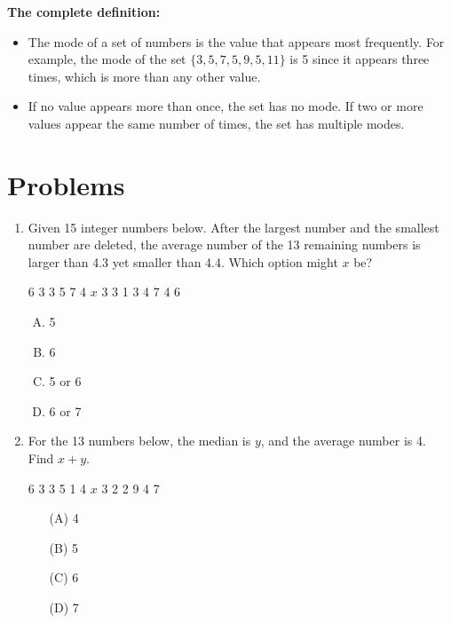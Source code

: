 \documentclass[11pt]{scrartcl}
\begin{document}
    \textbf{The complete definition:}
\begin{itemize}
    \item The mode of a set of numbers is the value that appears most frequently. For example, the mode of the set $\{3, 5, 7, 5, 9, 5, 11\}$ is 5 since it appears three times, which is more than any other value.

    \item If no value appears more than once, the set has no mode. If two or more values appear the same number of times, the set has multiple modes.
\end{itemize}
    
\section{Problems}
\begin{enumerate}
        \item Given 15 integer numbers below. After the largest number and the smallest number are deleted, the average number of the 13 remaining numbers is larger than 4.3 yet smaller than 4.4. Which option might $x$ be?
    \begin{tcolorbox}[colback=green!10!white,colframe=green!75!black,box align=center,
    halign=center,
    valign=center]
    6  3  3  5  7  4  $x$  3  3  1  3  4  7  4  6
    \end{tcolorbox}

    \begin{enumerate}[(A)]
        \item 5
        \item 6
        \item 5 or 6
        \item 6 or 7
    \end{enumerate}
    \vspace{3\baselineskip}

    \item For the 13 numbers below, the median is $y$, and the average number is 4. Find $x+y$.
    
   \begin{tcolorbox}[colback=red!10!white,colframe=red!75!black,box align=center,
    halign=center,
    valign=center]
    6 3 3 5 1 4 $x$ 3 2 2 9 4 7
    \end{tcolorbox}
   
   \begin{enumerate}
       \item[(A)] 4
       \item[(B)] 5
       \item[(C)] 6
       \item[(D)] 7
   \end{enumerate}
   \vspace{4\baselineskip}



\end{enumerate}
\end{document}
